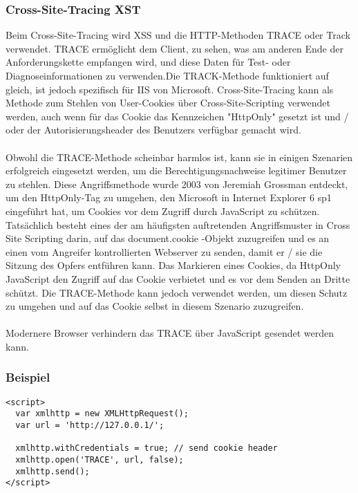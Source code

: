 {\subsubsection{Cross-Site-Tracing XST}
\label{sec:CSTXST}
Beim Cross-Site-Tracing wird XSS und die HTTP-Methoden TRACE oder Track verwendet. TRACE ermöglicht dem Client, zu sehen, was am anderen Ende der Anforderungskette empfangen wird, und diese Daten für Test- oder Diagnoseinformationen zu verwenden.Die TRACK-Methode funktioniert auf gleich, ist jedoch spezifisch für IIS von Microsoft. Cross-Site-Tracing kann als Methode zum Stehlen von User-Cookies über Cross-Site-Scripting verwendet werden, auch wenn für das Cookie das Kennzeichen "HttpOnly" gesetzt ist und / oder der Autorisierungsheader des Benutzers verfügbar gemacht wird.
\\ \\
Obwohl die TRACE-Methode scheinbar harmlos ist, kann sie in einigen Szenarien erfolgreich eingesetzt werden, um die Berechtigungsnachweise legitimer Benutzer zu stehlen. Diese Angriffsmethode wurde 2003 von Jeremiah Grossman entdeckt, um den HttpOnly-Tag zu umgehen, den Microsoft in Internet Explorer 6 sp1 eingeführt hat, um Cookies vor dem Zugriff durch JavaScript zu schützen. Tatsächlich besteht eines der am häufigsten auftretenden Angriffsmuster in Cross Site Scripting darin, auf das document.cookie -Objekt zuzugreifen und es an einen vom Angreifer kontrollierten Webserver zu senden, damit er / sie die Sitzung des Opfers entführen kann. Das Markieren eines Cookies, da HttpOnly JavaScript den Zugriff auf das Cookie verbietet und es vor dem Senden an Dritte schützt. Die TRACE-Methode kann jedoch verwendet werden, um diesen Schutz zu umgehen und auf das Cookie selbst in diesem Szenario zuzugreifen.
\\ \\
Modernere Browser verhindern das TRACE über JavaScript gesendet werden kann.
\subsubsection{Beispiel}
\label{sec:cst_bsp}
\begin{lstlisting}
<script>
  var xmlhttp = new XMLHttpRequest();
  var url = 'http://127.0.0.1/';

  xmlhttp.withCredentials = true; // send cookie header
  xmlhttp.open('TRACE', url, false);
  xmlhttp.send();
</script>
\end{lstlisting}
}
